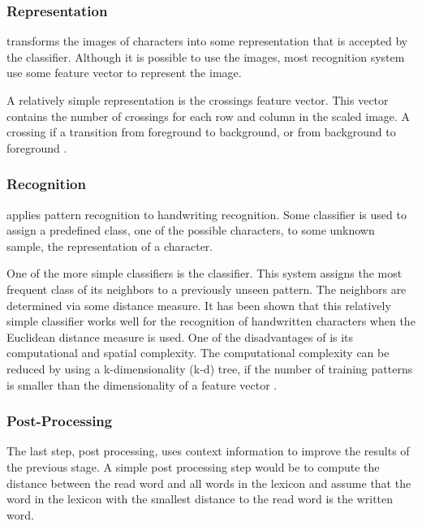	\subsubsection{Representation}
	\label{sss:introduction:offline:representation}
		 transforms the images of characters into some representation that is accepted by the classifier. Although it is possible to use the images, most recognition system use some feature vector to represent the image. 

		A relatively simple representation is the crossings feature vector. This vector contains the number of crossings for each row and column in the scaled image. A crossing if a transition from foreground to background, or from background to foreground \cite{HWR:features1,HWR:features2}.

	\subsubsection{Recognition}
	\label{sss:introduction:offline:recognition}
		 applies pattern recognition to handwriting recognition. Some classifier is used to assign a predefined class, one of the possible characters, to some unknown sample, the representation of a character. 

		One of the more simple classifiers is the \Knn classifier. This system assigns the most frequent class of its \knnk neighbors to a previously unseen pattern. The \knnk neighbors are determined via some distance measure. It has been shown that this relatively simple classifier works well for the recognition of handwritten characters when the Euclidean distance measure is used\cite{lee1991handwritten,smith1994handwritten,ha1997off}. One of the disadvantages of \knn is its computational and spatial complexity. The computational complexity can be reduced by using a k-dimensionality (k-d) tree, if the number of training patterns is smaller than the dimensionality of a feature vector \cite{bhatia2010survey}.

	\subsubsection{Post-Processing}
	\label{sss:introduction:offline:postprocessing}
		The last step, post processing, uses context information to improve the results of the previous stage. A simple post processing step would be to compute the distance between the read word and all words in the lexicon and assume that the word in the lexicon with the smallest distance to the read word is the written word. 

